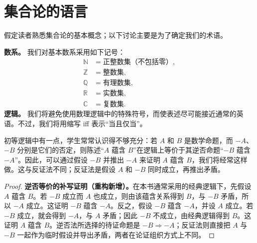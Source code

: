 \documentclass[../../main.tex]{subfiles}%
\begin{document}
\section{集合论的语言}\label{section:ch00-set-language}
假定读者熟悉集合论的基本概念；以下讨论主要是为了确定我们的术语。

\textbf{数系。} 我们对基本数系采用如下记号：
\begin{align*}
\mathbb{N}&=\text{正整数集（不包括零）},\\
\mathbb{Z}&=\text{整数集},\\
\mathbb{Q}&=\text{有理数集},\\
\mathbb{R}&=\text{实数集},\\
\mathbb{C}&=\text{复数集}.
\end{align*}
\textbf{逻辑。} 我们将避免使用数理逻辑中的特殊符号，而使表述尽可能接近通常的英语。不过，我们将用缩写 iff 表示“当且仅当”。


\begin{remark}
初等逻辑中有一点，学生常常认识得不够充分：若 $A$ 和 $B$ 是数学命题，而 $-A$、$-B$ 分别是它们的否定，则陈述“$A$ 蕴含 $B$”在逻辑上等价于其逆否命题“$-B$ 蕴含 $-A$”。因此，可以通过假设 $-B$ 并推出 $-A$ 来证明 $A$ 蕴含 $B$，我们将经常这样做。这与反证法不同；反证法是假设 $A$ 和 $-B$ 同时成立，再推出矛盾。
\end{remark}
\begin{proof}
\textbf{逆否等价的补写证明（重构新增）。}在本书通常采用的经典逻辑下，先假设 $A$ 蕴含 $B$。若 $-B$ 成立而 $A$ 也成立，则由该蕴含关系得到 $B$，与 $-B$ 矛盾，所以 $-A$ 成立。这证明 $-B$ 蕴含 $-A$。反之，假设 $-B$ 蕴含 $-A$，并设 $A$ 成立。若 $-B$ 成立，就会得到 $-A$，与 $A$ 矛盾；因此 $-B$ 不成立，由经典逻辑得到 $B$。这证明 $A$ 蕴含 $B$。逆否法所选择的待证命题是 $-B\Rightarrow-A$；反证法则直接把 $A$ 与 $-B$ 一起作为临时假设并导出矛盾，两者在论证组织方式上不同。
\end{proof}
\end{document}
